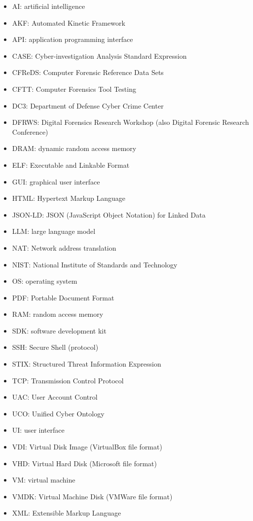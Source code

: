 \begin{itemize}
\item
  AI: artificial intelligence
\item
  AKF: Automated Kinetic Framework
\item
  API: application programming interface
\item
  CASE: Cyber-investigation Analysis Standard Expression
\item
  CFReDS: Computer Forensic Reference Data Sets
\item
  CFTT: Computer Forensics Tool Testing
\item
  DC3: Department of Defense Cyber Crime Center
\item
  DFRWS: Digital Forensics Research Workshop (also Digital Forensic
  Research Conference)
\item
  DRAM: dynamic random access memory
\item
  ELF: Executable and Linkable Format
\item
  GUI: graphical user interface
\item
  HTML: Hypertext Markup Language
\item
  JSON-LD: JSON (JavaScript Object Notation) for Linked Data
\item
  LLM: large language model
\item
  NAT: Network address translation
\item
  NIST: National Institute of Standards and Technology
\item
  OS: operating system
\item
  PDF: Portable Document Format
\item
  RAM: random access memory
\item
  SDK: software development kit
\item
  SSH: Secure Shell (protocol)
\item
  STIX: Structured Threat Information Expression
\item
  TCP: Transmission Control Protocol
\item
  UAC: User Account Control
\item
  UCO: Unified Cyber Ontology
\item
  UI: user interface
\item
  VDI: Virtual Disk Image (VirtualBox file format)
\item
  VHD: Virtual Hard Disk (Microsoft file format)
\item
  VM: virtual machine
\item
  VMDK: Virtual Machine Disk (VMWare file format)
\item
  XML: Extensible Markup Language
\end{itemize}
